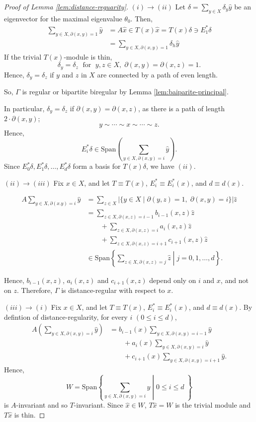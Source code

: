 \documentclass[
]{book}
\theoremstyle{definition}
\theoremstyle{definition}
\theoremstyle{definition}
\theoremstyle{definition}
\theoremstyle{remark}
\begin{document}
\begin{proof}[Proof of Lemma \ref{lem:distance-reguarity}]
\((i)\to (ii)\)
Let \(\delta = \sum_{y\in X}\delta_y\hat{y}\) be an eigenvector for the maximal eigenvalue \(\theta_0\). Then,
\begin{align}
\sum_{y\in X, \partial(x,y) = 1}\hat{y} & = A\hat{x} \in T(x)\hat{x} = T(x)\delta \ni E^*_1\delta\\
& = \sum_{y\in X, \partial(x,y)=1}\delta_h\hat{y}
\end{align}
If the trivial \(T(x)\)-module is thin,
\[\delta_y = \delta_z \; \text{ for }\; y, z\in X, \; \partial(x,y) = \partial(x,z) = 1.\]
Hence, \(\delta_y = \delta_z\) if \(y\) and \(z\) in \(X\) are connected by a path of even length.

So, \(\Gamma\) is regular or bipartite biregular by Lemma \ref{lem:baiparite-principal}.

In particular, \(\delta_y = \delta_z\) if \(\partial(x,y) = \partial(x,z)\), as there is a path of length \(2\cdot \partial(x,y)\);
\[y\sim \cdots \sim x \sim \cdots \sim z.\]
Hence,
\[E^*_i\delta \in \mathrm{Span}\left(\sum_{y\in X, \partial(x,y) = i}\hat{y}\right).\]
Since \(E^*_0\delta, E^*_1\delta, \ldots, E^*_d\delta\) form a basis for \(T(x)\delta\), we have \((ii)\).

\((ii)\to (iii)\)
Fix \(x\in X\), and let \(T \equiv T(x)\), \(E^*_i\equiv E^*_i(x)\), and \(d \equiv d(x)\).

\begin{align}
A\sum_{y\in X, \partial(x.y)=i}\hat{y} & = \sum_{z\in X} |\{y\in X \mid \partial(y,z) = 1, \; \partial(x,y) = i\}|\hat{z}\\
& = \sum_{z\in X, \partial(x,z) = i-1}b_{i-1}(x,z)\hat{z} \\
& \qquad + \sum_{z\in X, \partial(x,z) = i} a_{i}(x,z)\hat{z} \\
& \qquad + \sum_{z\in X, \partial(x,z) = i+1} c_{i+1}(x,z)\hat{z}\\
& \in \mathrm{Span}\left\{\left.\sum_{z\in X, \partial(x,z) = j}\hat{z} \; \right| \; j = 0, 1, \ldots, d \right\}.
\end{align}

Hence, \(b_{i-1}(x,z)\), \(a_i(x,z)\) and \(c_{i+1}(x,z)\) depend only on \(i\) and \(x\), and not on \(z\).
Therefore, \(\Gamma\) is distance-regular with respect to \(x\).

\((iii)\to (i)\)
Fix \(x\in X\), and let \(T \equiv T(x)\), \(E^*_i\equiv E^*_i(x)\), and \(d \equiv d(x)\).
By defintion of distance-regularity, for every \(i\) \((0\leq i\leq d)\),
\begin{align}
A\left(\sum_{y\in X, \partial(x,y)=i}\hat{y}\right) & = 
b_{i-1}(x)\sum_{y\in X, \partial(x,y) = i-1}\hat{y} \\
& \qquad + a_{i}(x)\sum_{y\in X, \partial(x,y) = i}\hat{y}\\
& \qquad + c_{i+1}(x)\sum_{y\in X, \partial(x,y) = i+1}\hat{y}.
\end{align}
Hence,
\[W = \mathrm{Span}\left\{\left.\sum_{y\in X, \partial(x,y)=i}\hat{y} \; \right| \; 0\leq i\leq d\; \right\}\]
is \(A\)-invariant and so \(T\)-invariant. Since \(\hat{x}\in W\), \(T\hat{x} = W\) is the trivial module and \(T\hat{x}\) is thin.
\end{proof}
\end{document}

